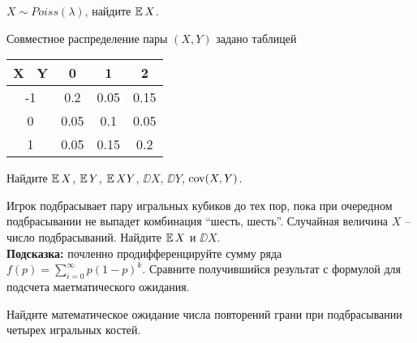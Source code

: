 \begin{problem}
    $X \sim Poiss(\lambda)$, найдите $\operatorname{\mathbb{E}} X$.
\end{problem}

\begin{problem}
    Совместное распределение пары $(X, Y)$ задано таблицей
    \begin{center}
    \begin{tabular}{c|c|c|c}
        X \ Y & 0 & 1 & 2 \\
        \hline
        -1 & 0.2 & 0.05 & 0.15 \\
        \hline
        0 & 0.05 & 0.1 & 0.05 \\
        \hline
        1 & 0.05 & 0.15 & 0.2 \\
    \end{tabular}
    \end{center}
    Найдите $\operatorname{\mathbb{E}} X$, $\operatorname{\mathbb{E}} Y$, $\operatorname{\mathbb{E}} XY$, $\DD X$, $\DD Y$, $\operatorname{\mathrm{cov}}(X, Y)$. 
\end{problem}


\begin{problem}
    Игрок подбрасывает пару игральных кубиков до тех пор, пока при очередном подбрасывании не выпадет комбинация ``шесть, шесть''.
    Случайная величина $X$ -- число подбрасываний.
    Найдите $\operatorname{\mathbb{E}} X$ и $\DD X$.\\
    \textbf{Подсказка:} почленно продифференцируйте сумму ряда
    $
        f(p) = \sum_{i = 0}^{\infty} p (1 - p)^k.
    $
    Сравните получившийся результат с формулой для подсчета маетматического ожидания.
\end{problem}

\begin{problem}
    Найдите математическое ожидание числа повторений грани при подбрасывании четырех игральных костей.
\end{problem}


